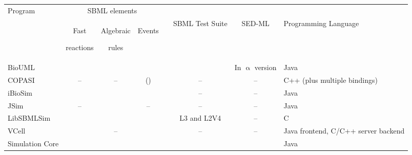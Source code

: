 \documentclass[10pt]{bmc_article}
\newenvironment{bmcformat}{\baselineskip20pt\sloppy\setboolean{publ}{false}}{\baselineskip20pt\sloppy}
\newcommand{\yes}{\ding{51}} %
\newcommand{\no}{--} %
\begin{document}
\begin{bmcformat}
\begin{tabular}{lccccccp{2.5cm}}
\toprule
Program &
\multicolumn{3}{c}{SBML elements} & & \\
\cline{2-4}
 &
\multicolumn{1}{C{1.3cm}}{
  \begin{sideways}Fast\end{sideways}
  \begin{sideways}reactions\end{sideways}
 }  & 
\multicolumn{1}{C{1.3cm}}{
  \begin{sideways}Algebraic \; \end{sideways}
  \begin{sideways}rules\end{sideways}
} & 
\multicolumn{1}{C{1.3cm}}{
  \begin{sideways}Events\end{sideways}
} & &
  SBML Test Suite
  & SED-ML &
  Programming Language \\
\midrule
BioUML          & \yes & \yes & \yes    & & \yes        & In $\upalpha$ version & Java \\
COPASI          & \no  & \no  & (\yes)  & & \no         & \no                   & C++ (plus multiple bindings) \\
iBioSim         & \yes & \yes & \yes    & & \no         & \no                   & Java \\
JSim            & \no  & \yes & \no     & & \no         & \no                   & Java \\
LibSBMLSim      & \yes & \yes & \yes    & & L3 and L2V4 & \no                   & C \\
VCell           & \yes & \no  & \yes    & & \no         & \no                   & Java frontend, C/C++ server backend \\
Simulation Core & \yes & \yes & \yes    & & \yes        & \yes                  & Java \\
\bottomrule
\end{tabular}


\end{bmcformat}
\end{document}
